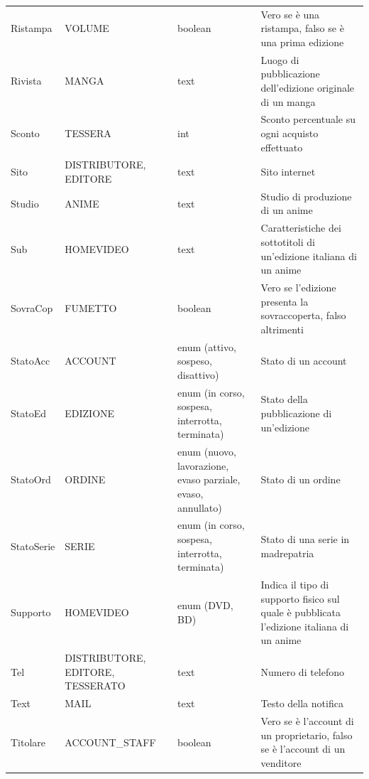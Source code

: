 \documentclass[a4paper]{scrartcl}
\begin{document}
\begin{footnotesize}
\begin{longtable}{p{} p{} p{} p{}}
	Ristampa &
	VOLUME &
	boolean &
	Vero se è una ristampa, falso se è una prima edizione \\
	
	Rivista &
	MANGA &
	text &
	Luogo di pubblicazione dell'edizione originale di un manga \\
	
	Sconto &
	TESSERA &
	int &
	Sconto percentuale su ogni acquisto effettuato \\
	
	Sito &
	DISTRIBUTORE, EDITORE &
	text &
	Sito internet \\
	
	Studio &
	ANIME &
	text &
	Studio di produzione di un anime \\
	
	Sub &
	HOMEVIDEO &
	text &
	Caratteristiche dei sottotitoli di un'edizione italiana di un anime \\
	
	SovraCop &
	FUMETTO &
	boolean &
	Vero se l'edizione presenta la sovraccoperta, falso altrimenti \\
	
	StatoAcc &
	ACCOUNT &
	enum (attivo, sospeso, disattivo) &
	Stato di un account \\
	
	StatoEd &
	EDIZIONE &
	enum (in corso, sospesa, interrotta, terminata) &
	Stato della pubblicazione di un'edizione \\
	
	StatoOrd &
	ORDINE &
	enum (nuovo, lavorazione, evaso parziale, evaso, annullato)  &
	Stato di un ordine \\
	
	StatoSerie &
	SERIE &
	enum (in corso, sospesa, interrotta, terminata) &
	Stato di una serie in madrepatria \\
	
	Supporto &
	HOMEVIDEO &
	enum (DVD, BD) &
	Indica il tipo di supporto fisico sul quale è pubblicata l'edizione italiana di un anime \\
	
	Tel &
	DISTRIBUTORE, EDITORE, TESSERATO &
	text &
	Numero di telefono \\
	
	Text &
	MAIL &
	text &
	Testo della notifica \\	

	Titolare &
	ACCOUNT\_{STAFF} &
	boolean &
	Vero se è l'account di un proprietario, falso se è l'account di un venditore \\	
	

\end{longtable}
\end{footnotesize}
\end{document}
